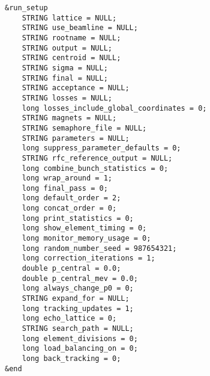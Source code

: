 \documentclass[11pt]{article}
\begin{document}
\begin{verbatim}
&run_setup
    STRING lattice = NULL;
    STRING use_beamline = NULL;
    STRING rootname = NULL;
    STRING output = NULL;
    STRING centroid = NULL;
    STRING sigma = NULL;
    STRING final = NULL;
    STRING acceptance = NULL;
    STRING losses = NULL;
    long losses_include_global_coordinates = 0;
    STRING magnets = NULL;
    STRING semaphore_file = NULL;
    STRING parameters = NULL;
    long suppress_parameter_defaults = 0;
    STRING rfc_reference_output = NULL;
    long combine_bunch_statistics = 0;
    long wrap_around = 1;
    long final_pass = 0;
    long default_order = 2;
    long concat_order = 0;
    long print_statistics = 0;
    long show_element_timing = 0;
    long monitor_memory_usage = 0;
    long random_number_seed = 987654321;
    long correction_iterations = 1;
    double p_central = 0.0;
    double p_central_mev = 0.0;
    long always_change_p0 = 0;
    STRING expand_for = NULL; 
    long tracking_updates = 1;
    long echo_lattice = 0;
    STRING search_path = NULL;
    long element_divisions = 0;
    long load_balancing_on = 0;
    long back_tracking = 0;
&end
\end{verbatim}
\end{document}
